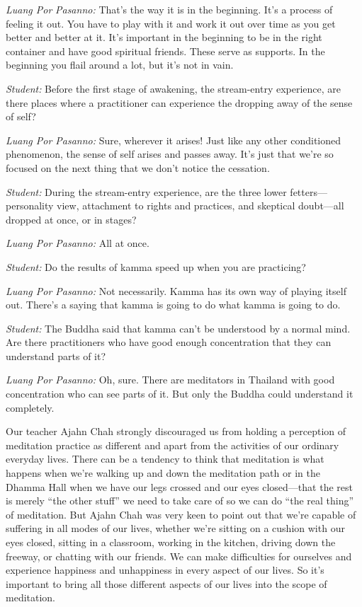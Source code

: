 \emph{Luang Por} \emph{Pasanno:} That's the way it is in the beginning. 
It's a process of feeling it out. You have to play with it and work it 
out over time as you get better and better at it. It's important in the 
beginning to be in the right container and have good spiritual friends. 
These serve as supports. In the beginning you flail around a lot, but 
it's not in vain.

\emph{Student:} Before the first stage of awakening, the stream-entry 
experience, are there places where a practitioner can experience the 
dropping away of the sense of self?

\emph{Luang Por Pasanno:} Sure, wherever it arises! Just like any other 
conditioned phenomenon, the sense of self arises and passes away. It's 
just that we're so focused on the next thing that we don't notice the 
cessation.

\emph{Student:} During the stream-entry experience, are the three lower 
fetters---personality view, attachment to rights and practices, and 
skeptical doubt---all dropped at once, or in stages?

\emph{Luang Por Pasanno:} All at once.

\emph{Student:} Do the results of kamma speed up when you are 
practicing?

\emph{Luang Por Pasanno:} Not necessarily. Kamma has its own way of 
playing itself out. There's a saying that kamma is going to do what 
kamma is going to do.

\emph{Student:} The Buddha said that kamma can't be understood by a 
normal mind. Are there practitioners who have good enough concentration 
that they can understand parts of it?

\emph{Luang Por Pasanno:} Oh, sure. There are meditators in Thailand 
with good concentration who can see parts of it. But only the Buddha 
could understand it completely.


Our teacher Ajahn Chah strongly discouraged us from holding a 
perception of meditation practice as different and apart from the 
activities of our ordinary everyday lives. There can be a tendency to 
think that meditation is what happens when we're walking up and down 
the meditation path or in the Dhamma Hall when we have our legs crossed 
and our eyes closed---that the rest is merely ``the other stuff'' we 
need to take care of so we can do ``the real thing'' of meditation. But 
Ajahn Chah was very keen to point out that we're capable of suffering 
in all modes of our lives, whether we're sitting on a cushion with our 
eyes closed, sitting in a classroom, working in the kitchen, driving 
down the freeway, or chatting with our friends. We can make 
difficulties for ourselves and experience happiness and unhappiness in 
every aspect of our lives. So it's important to bring all those 
different aspects of our lives into the scope of meditation.

